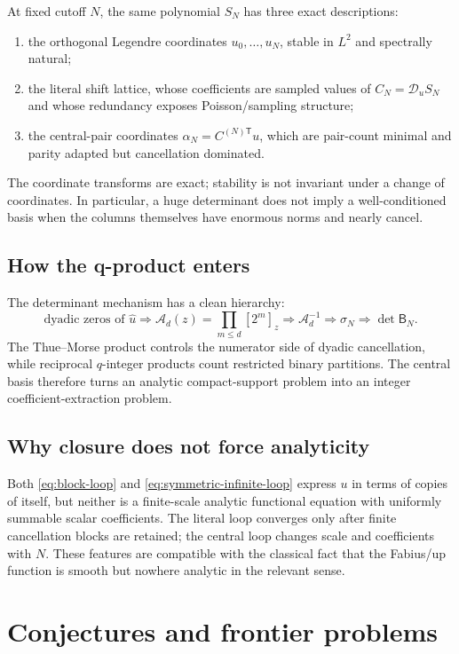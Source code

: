\documentclass[11pt,oneside]{article}
\numberwithin{equation}{section}
\theoremstyle{definition}
\theoremstyle{remark}
\newcommand{\Dscr}{\mathscr D_u}
\begin{document}
At fixed cutoff $N$, the same polynomial $S_N$ has three exact descriptions:
\begin{enumerate}[leftmargin=1.8em,itemsep=0.25em]
\item the orthogonal Legendre coordinates $u_0,\ldots,u_N$, stable in
$L^2$ and spectrally natural;
\item the literal shift lattice, whose coefficients are sampled values of
$C_N=\Dscr S_N$ and whose redundancy exposes Poisson/sampling structure;
\item the central-pair coordinates $\alpha_N=C^{(N)\mathsf T}u$, which are
pair-count minimal and parity adapted but cancellation dominated.
\end{enumerate}
The coordinate transforms are exact; stability is not invariant under a
change of coordinates.  In particular, a huge determinant does not imply a
well-conditioned basis when the columns themselves have enormous norms and
nearly cancel.

\subsection{How the q-product enters}

The determinant mechanism has a clean hierarchy:
\[
 \text{dyadic zeros of }\widehat u
 \Longrightarrow \mathcal A_d(z)=\prod_{m\le d}[2^m]_z
 \Longrightarrow \mathcal A_d^{-1}
 \Longrightarrow \sigma_N
 \Longrightarrow \det\mathsf B_N.
\]
The Thue--Morse product controls the numerator side of dyadic cancellation,
while reciprocal $q$-integer products count restricted binary partitions.
The central basis therefore turns an analytic compact-support problem into an
integer coefficient-extraction problem.

\subsection{Why closure does not force analyticity}

Both \eqref{eq:block-loop} and \eqref{eq:symmetric-infinite-loop} express $u$
in terms of copies of itself, but neither is a finite-scale analytic
functional equation with uniformly summable scalar coefficients.  The literal
loop converges only after finite cancellation blocks are retained; the central
loop changes scale and coefficients with $N$.  These features are compatible
with the classical fact that the Fabius/up function is smooth but nowhere
analytic in the relevant sense.

\section{Conjectures and frontier problems}
\label{sec:frontiers}
\end{document}
